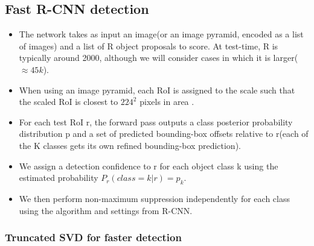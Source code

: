 \documentclass[11pt]{article}
\begin{document}
\subsection{Fast R-CNN detection}
\label{sec-1-2}


\begin{itemize}
\item The network takes as input an image(or an image pyramid, encoded as a list of images) and a list
     of R object proposals to score. At test-time, R is typically around 2000, although we will 
     consider cases in which it is larger($\approx45k$).
\item When using an image pyramid, each RoI is assigned to the scale such that the scaled RoI is
     closest to $224^2$ pixels in area \footnotemark[4].
\item For each test RoI r, the forward pass outputs a class posterior probability distribution p and
     a set of predicted bounding-box offsets relative to r(each of the K classes gets its own refined
     bounding-box prediction).
\item We assign a detection confidence to r for each object class k using the estimated probability 
     $P_r(class=k|r)=p_k$.
\item We then perform non-maximum suppression independently for each class using the algorithm and 
     settings from R-CNN\footnotemark[1].
\end{itemize}
\subsubsection{Truncated SVD for faster detection}
\label{sec-1-2-1}
\end{document}
